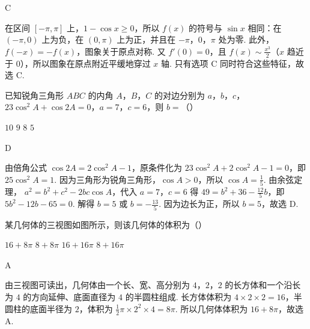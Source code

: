 \begin{answer}
C
\end{answer}

\begin{solution}
在区间 \([-\pi,\pi]\) 上，\(1-\cos x\geqslant0\)，所以 \(f(x)\) 的符号与 \(\sin x\) 相同：在 \((-\pi,0)\) 上为负，在 \((0,\pi)\) 上为正，并且在 \(-\pi\)，\(0\)，\(\pi\) 处为零. 此外，\(f(-x)=-f(x)\)，图象关于原点对称. 又 \(f'(0)=0\)，且 \(f(x)\sim\frac{x^3}{2}\)（\(x\) 趋近于 \(0\)），所以图象在原点附近平缓地穿过 \(x\) 轴. 只有选项 C 同时符合这些特征，故选 C.
\end{solution}

\begin{problem}
已知锐角三角形 \(ABC\) 的内角 \(A\)，\(B\)，\(C\) 的对边分别为 \(a\)，\(b\)，\(c\)，\(23\cos^{2} A + \cos 2A = 0\)，\(a = 7\)，\(c = 6\)，则 \(b =\)（\quad）

\choices
    {\(10\)}
    {\(9\)}
    {\(8\)}
    {\(5\)}
\end{problem}

\begin{answer}
D
\end{answer}

\begin{solution}
由倍角公式 \(\cos 2A=2\cos^2A-1\)，原条件化为 \(23\cos^2A+2\cos^2A-1=0\)，即 \(25\cos^2A=1\). 因为三角形为锐角三角形，\(\cos A>0\)，所以 \(\cos A=\frac{1}{5}\). 由余弦定理，
\(\displaystyle a^2=b^2+c^2-2bc\cos A\)，代入 \(a=7\)，\(c=6\) 得 \(49=b^2+36-\frac{12}{5}b\)，即 \(5b^2-12b-65=0\). 解得 \(b=5\) 或 \(b=-\frac{13}{5}\). 因为边长为正，所以 \(b=5\)，故选 D.
\end{solution}

\begin{problem}
某几何体的三视图如图所示，则该几何体的体积为（\quad）


\choices
    {\(16 + 8\pi\)}
    {\(8 + 8\pi\)}
    {\(16 + 16\pi\)}
    {\(8 + 16\pi\)}
\end{problem}

\begin{answer}
A
\end{answer}

\begin{solution}
由三视图可读出，几何体由一个长、宽、高分别为 \(4\)，\(2\)，\(2\) 的长方体和一个沿长为 \(4\) 的方向延伸、底面直径为 \(4\) 的半圆柱组成. 长方体体积为 \(4\times2\times2=16\)，半圆柱的底面半径为 \(2\)，体积为 \(\displaystyle\frac{1}{2}\pi\times2^2\times4=8\pi\). 所以几何体体积为 \(16+8\pi\)，故选 A.
\end{solution}

